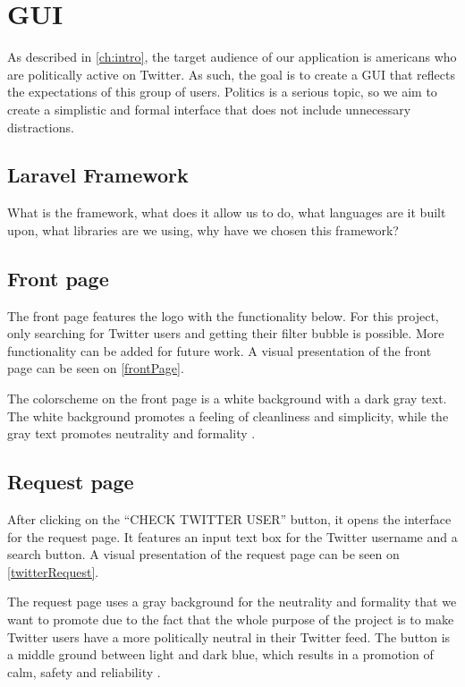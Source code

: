 \chapter{GUI} \label{GUI}
As described in \autoref{ch:intro}, the target audience of our application is
americans who are politically active on Twitter. As such, the goal is to create
a GUI that reflects the expectations of this group of users. Politics is a serious
topic, so we aim to create a simplistic and formal interface that does not
include unnecessary distractions.

\section{Laravel Framework}\label{sec:laravel}
What is the framework, what does it allow us to do, what languages are it built
upon, what libraries are we using, why have we chosen this framework?


\section{Front page}
The front page features the logo with the functionality below. For this
project, only searching for Twitter users and getting their filter bubble is
possible. More functionality can be added for future work. A visual
presentation of the front page can be seen on \autoref{frontPage}.

{}

The colorscheme on the front page is a white background with a dark gray text.
The white background promotes a feeling of cleanliness and simplicity, while the
gray text promotes neutrality and formality \citep[p. 63 \& 64]{WebUI}. 

\section{Request page}
After clicking on the ``CHECK TWITTER USER'' button, it opens the interface for
the request page. It features an input text box for the Twitter username and a
search button. A visual presentation of the request page can be seen on \autoref{twitterRequest}.


The request page uses a gray background for the neutrality and formality that we
want to promote due to the fact that the whole purpose of the project is to
make Twitter users have a more politically neutral in their Twitter feed.
The button is a middle ground between light and dark blue, which results in
a promotion of calm, safety and reliability \citep[p. 61 \& 64]{WebUI}.

